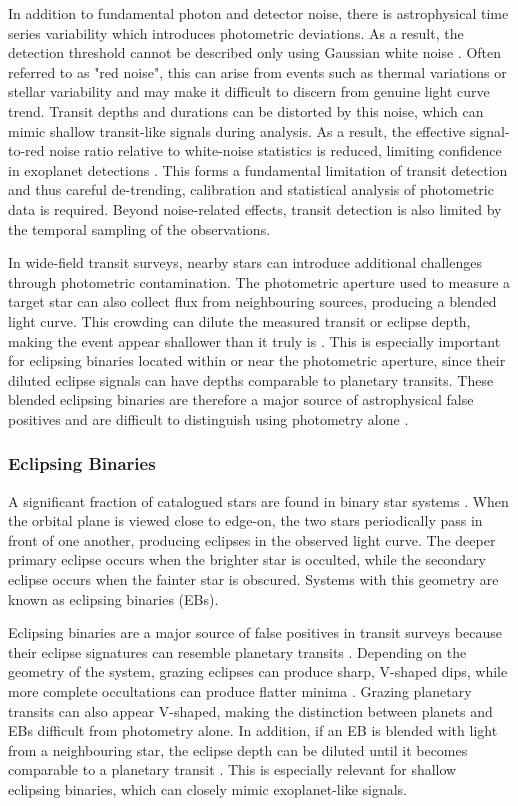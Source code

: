 In addition to fundamental photon and detector noise, there is astrophysical time series variability which introduces photometric deviations. As a result, the detection threshold cannot be described only using Gaussian white noise \citep{2006MNRAS.373..231P}. Often referred to as "red noise", this can arise from events such as thermal variations or stellar variability and may make it difficult to discern from genuine light curve trend. Transit depths and durations can be distorted by this noise, which can mimic shallow transit-like signals during analysis. As a result, the effective signal-to-red noise ratio relative to white-noise statistics is reduced, limiting confidence in exoplanet detections \citep{2006MNRAS.373..799C}. This forms a fundamental limitation of transit detection and thus careful de-trending, calibration and statistical analysis of photometric data is required. Beyond noise-related effects, transit detection is also limited by the temporal sampling of the observations.

In wide-field transit surveys, nearby stars can introduce additional challenges through photometric contamination. The photometric aperture used to measure a target star can also collect flux from neighbouring sources, producing a blended light curve. This crowding can dilute the measured transit or eclipse depth, making the event appear shallower than it truly is \citep{Morton_2016}. This is especially important for eclipsing binaries located within or near the photometric aperture, since their diluted eclipse signals can have depths comparable to planetary transits. These blended eclipsing binaries are therefore a major source of astrophysical false positives and are difficult to distinguish using photometry alone \citep{2011ApJ...738..170M}.

\subsubsection{Eclipsing Binaries}

A significant fraction of catalogued stars are found in binary star systems \citep{2010A&ARv..18...67T}. When the orbital plane is viewed close to edge-on, the two stars periodically pass in front of one another, producing eclipses in the observed light curve. The deeper primary eclipse occurs when the brighter star is occulted, while the secondary eclipse occurs when the fainter star is obscured. Systems with this geometry are known as eclipsing binaries (EBs).

Eclipsing binaries are a major source of false positives in transit surveys because their eclipse signatures can resemble planetary transits \citep{Morton_2016}. Depending on the geometry of the system, grazing eclipses can produce sharp, V-shaped dips, while more complete occultations can produce flatter minima \citep{2010exop.book...55W}. Grazing planetary transits can also appear V-shaped, making the distinction between planets and EBs difficult from photometry alone. In addition, if an EB is blended with light from a neighbouring star, the eclipse depth can be diluted until it becomes comparable to a planetary transit \citep{Morton_2016}. This is especially relevant for shallow eclipsing binaries, which can closely mimic exoplanet-like signals.

